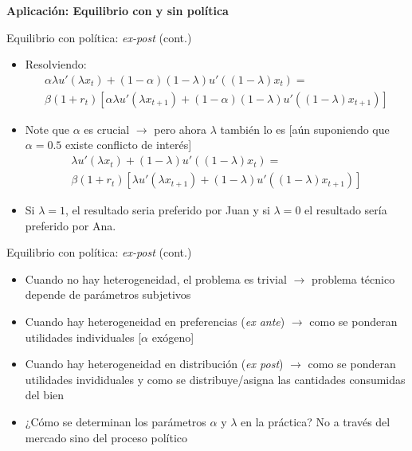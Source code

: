 \documentclass[
  ignorenonframetext,
]{beamer}
\providecommand{\tightlist}{%
  \setlength{\itemsep}{0pt}\setlength{\parskip}{0pt}}\usepackage{longtable,booktabs,array}
\begin{document}
\begin{frame}{\textbf{Aplicación: Equilibrio con y sin política}}
\begin{block}{Equilibrio con política: \emph{ex-post} (cont.)}
\protect\hypertarget{equilibrio-con-poluxedtica-ex-post-cont.}{}
\begin{itemize}
\tightlist
\item
  Resolviendo: \[\begin{aligned}
    \alpha \lambda u'(\lambda
          x_{t})+(1-\alpha)(1-\lambda)u'((1-\lambda)x_{t})= \\
          \beta(1+r_{t})\left[\alpha \lambda u'(\lambda
          x_{t+1})+(1-\alpha)(1-\lambda)u'((1-\lambda)x_{t+1})\right]
        \end{aligned}\]
\item
  Note que \(\alpha\) es crucial \(\longrightarrow\) pero ahora
  \(\lambda\) también lo es {[}aún suponiendo que \(\alpha=0.5\) existe
  conflicto de interés{]} \[\begin{aligned}
  \lambda u'(\lambda
              x_{t})+(1-\lambda)u'((1-\lambda)x_{t})= \\
              \beta(1+r_{t})\left[\lambda u'(\lambda
          x_{t+1})+(1-\lambda)u'((1-\lambda)x_{t+1})\right]
              \end{aligned}\]
\item
  Si \(\lambda=1\), el resultado seria preferido por Juan y si
  \(\lambda=0\) el resultado sería preferido por Ana.
\end{itemize}
\end{block}

\begin{block}{Equilibrio con política: \emph{ex-post} (cont.)}
\protect\hypertarget{equilibrio-con-poluxedtica-ex-post-cont.-1}{}
\begin{itemize}
\tightlist
\item
  Cuando no hay heterogeneidad, el problema es trivial
  \(\longrightarrow\) problema técnico depende de parámetros subjetivos
\item
  Cuando hay heterogeneidad en preferencias (\emph{ex ante})
  \(\longrightarrow\) como se ponderan utilidades individuales
  {[}\(\alpha\) exógeno{]}
\item
  Cuando hay heterogeneidad en distribución (\emph{ex post})
  \(\longrightarrow\) como se ponderan utilidades invididuales y como se
  distribuye/asigna las cantidades consumidas del bien
\item
  ¿Cómo se determinan los parámetros \(\alpha\) y \(\lambda\) en la
  práctica? No a través del mercado sino del proceso político
\end{itemize}
\end{block}


\end{frame}
\end{document}
